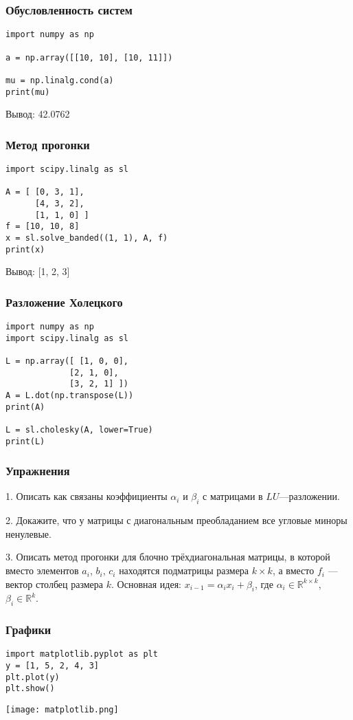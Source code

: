 \documentclass[10pt]{beamer}
\begin{document}
\begin{frame}[fragile]
\frametitle{Обусловленность систем}

\begin{lstlisting}
import numpy as np
 
a = np.array([[10, 10], [10, 11]])

mu = np.linalg.cond(a)
print(mu)
\end{lstlisting}

Вывод: 42.0762
\end{frame}

\begin{frame}[fragile]
\frametitle{Метод прогонки}

\begin{lstlisting}
import scipy.linalg as sl

A = [ [0, 3, 1],
      [4, 3, 2],
      [1, 1, 0] ]
f = [10, 10, 8]
x = sl.solve_banded((1, 1), A, f)
print(x)
\end{lstlisting}

Вывод: [1, 2, 3]
\end{frame}

\begin{frame}[fragile]
\frametitle{Разложение Холецкого}
\begin{lstlisting}
import numpy as np
import scipy.linalg as sl

L = np.array([ [1, 0, 0],
             [2, 1, 0],
             [3, 2, 1] ])
A = L.dot(np.transpose(L))
print(A)

L = sl.cholesky(A, lower=True)
print(L)
\end{lstlisting}
\end{frame}

\begin{frame}[fragile]
\frametitle{Упражнения}

1. Описать как связаны коэффициенты $\alpha_{i}$ и $\beta_{i}$ с матрицами в $LU$---разложении.

2. Докажите, что у матрицы с диагональным преобладанием все угловые миноры ненулевые.

3. Описать метод прогонки для блочно трёхдиагональная матрицы, в которой вместо элементов $a_i$, $b_i$, $c_i$ находятся подматрицы размера $k \times k$, а вместо $f_i$ --- вектор столбец размера $k$. Основная идея: $x_{i-1} = \alpha_i x_i + \beta_i$, где $\alpha_i \in \mathbb{R}^{k \times k}$, $\beta_i \in \mathbb{R}^k$.

\end{frame}

\begin{frame}[fragile]
\frametitle{Графики}

\begin{lstlisting}
import matplotlib.pyplot as plt
y = [1, 5, 2, 4, 3]
plt.plot(y)
plt.show()
\end{lstlisting}

\begin{center}
\texttt{[image: matplotlib.png]}
\end{center}
\end{frame}
\end{document}
